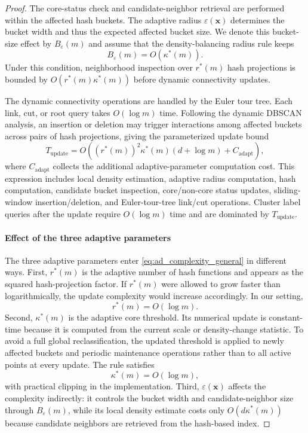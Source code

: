 \documentclass[preprint,12pt,authoryear]{elsarticle}
\theoremstyle{definition}
\begin{document}
\begin{proof}
The core-status check and candidate-neighbor retrieval are performed within the affected hash buckets. The adaptive radius $\varepsilon(\bm{x})$ determines the bucket width and thus the expected affected bucket size. We denote this bucket-size effect by $B_{\varepsilon}(m)$ and assume that the density-balancing radius rule keeps
\begin{equation}
B_{\varepsilon}(m)=O(\kappa^*(m)).
\end{equation}
Under this condition, neighborhood inspection over $r^*(m)$ hash projections is bounded by $O(r^*(m)\kappa^*(m))$ before dynamic connectivity updates.

The dynamic connectivity operations are handled by the Euler tour tree. Each link, cut, or root query takes $O(\log m)$ time. Following the dynamic DBSCAN analysis, an insertion or deletion may trigger interactions among affected buckets across pairs of hash projections, giving the parameterized update bound
\begin{equation}
T_{\mathrm{update}}
=O\!\left((r^*(m))^2\kappa^*(m)(d+\log m)+C_{\mathrm{adapt}}\right),
\label{eq:ad_complexity_general}
\end{equation}
where $C_{\mathrm{adapt}}$ collects the additional adaptive-parameter computation cost.
This expression includes local density estimation, adaptive radius computation, hash computation, candidate bucket inspection, core/non-core status updates, sliding-window insertion/deletion, and Euler-tour-tree link/cut operations. Cluster label queries after the update require $O(\log m)$ time and are dominated by $T_{\mathrm{update}}$.

\paragraph{Effect of the three adaptive parameters}
The three adaptive parameters enter \eqref{eq:ad_complexity_general} in different ways. First, $r^*(m)$ is the adaptive number of hash functions and appears as the squared hash-projection factor. If $r^*(m)$ were allowed to grow faster than logarithmically, the update complexity would increase accordingly. In our setting,
\begin{equation}
r^*(m)=O(\log m).
\end{equation}
Second, $\kappa^*(m)$ is the adaptive core threshold. Its numerical update is constant-time because it is computed from the current scale or density-change statistic. To avoid a full global reclassification, the updated threshold is applied to newly affected buckets and periodic maintenance operations rather than to all active points at every update. The rule satisfies
\begin{equation}
\kappa^*(m)=O(\log m),
\end{equation}
with practical clipping in the implementation. Third, $\varepsilon(\bm{x})$ affects the complexity indirectly: it controls the bucket width and candidate-neighbor size through $B_{\varepsilon}(m)$, while its local density estimate costs only $O(d\kappa^*(m))$ because candidate neighbors are retrieved from the hash-based index.


\end{proof}
\end{document}
